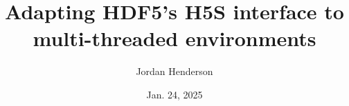 \documentclass[letterpaper,rfc,hyper]{HDF5_RFC}
\title{Adapting HDF5's H5S interface to multi-threaded environments}
\author{Jordan Henderson}
\date{Jan. 24, 2025}
\begin{document}
\maketitle



\newpage
\tableofcontents

\newpage



%



\makerevisions




\appendix



\end{document}
